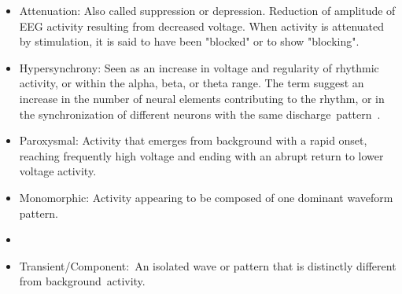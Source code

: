 \documentclass[brainsci,article,accept,moreauthors,pdftex,10pt,a4paper]{mdpi}
\begin{document}
\begin{itemize}[leftmargin=*,labelsep=5.8mm]
\item Attenuation: Also called suppression or depression. Reduction of amplitude of EEG activity resulting from decreased voltage. When activity is attenuated by stimulation, it is said to have been "blocked" or to show "blocking".
\item Hypersynchrony: Seen as an increase in voltage and regularity of rhythmic activity, or within the alpha, beta, or theta range. The term suggest an increase in the number of neural elements contributing to the rhythm, or in the synchronization of different neurons with the same discharge~pattern~\citep{Buzsaki2012}.
\item Paroxysmal: Activity that emerges from background with a rapid onset, reaching frequently high voltage and ending with an abrupt return to lower voltage activity. 
\item Monomorphic: Activity appearing to be composed of one dominant waveform pattern.
\item {}
\item Transient/Component:~An isolated wave or pattern that is distinctly different from background~activity. 
\end{itemize}

\end{document}
